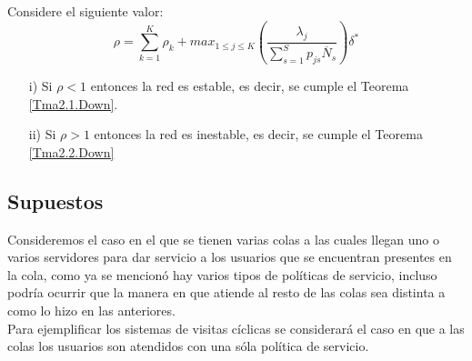 \begin{Teo}\label{Tma2.3.Down}
Considere el siguiente valor:
\begin{equation}\label{Eq.Rho.1serv}
\rho=\sum_{k=1}^{K}\rho_{k}+max_{1\leq j\leq K}\left(\frac{\lambda_{j}}{\sum_{s=1}^{S}p_{js}\overline{N}_{s}}\right)\delta^{*}
\end{equation}
\begin{itemize}
\item[i)] Si $\rho<1$ entonces la red es estable, es decir, se
cumple el Teorema \ref{Tma2.1.Down}.

\item[ii)] Si $\rho>1$ entonces la red es inestable, es decir, se
cumple el Teorema \ref{Tma2.2.Down}
\end{itemize}
\end{Teo}

\subsection{Supuestos}
Consideremos el caso en el que se tienen varias colas a las cuales
llegan uno o varios servidores para dar servicio a los usuarios
que se encuentran presentes en la cola, como ya se mencion\'o hay
varios tipos de pol\'iticas de servicio, incluso podr\'ia ocurrir
que la manera en que atiende al resto de las colas sea distinta a
como lo hizo en las anteriores.\\

Para ejemplificar los sistemas de visitas c\'iclicas se
considerar\'a el caso en que a las colas los usuarios son atendidos con
una s\'ola pol\'itica de servicio.\\


